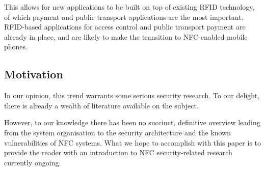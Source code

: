
This allows for new applications to be built on top of existing RFID technology, of which payment and public transport applications are the most important.
RFID-based applications for access control and public transport payment are already in place, and are likely to make the transition to NFC-enabled mobile phones.

\subsection{Motivation}
In our opinion, this trend warrants some serious security research. To our delight, there is already a wealth of literature available on the subject.

However, to our knowledge there has been no succinct, definitive overview leading from the system organisation to the security architecture and the known vulnerabilities of NFC systems.
What we hope to accomplish with this paper is to provide the reader with an introduction to NFC security-related research currently ongoing.

